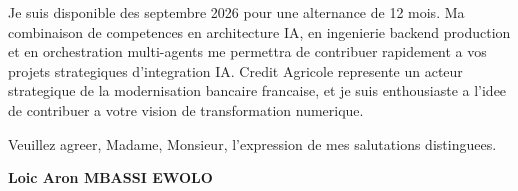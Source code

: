 \documentclass[a4paper,11pt]{article}
\begin{document}
Je suis disponible des septembre 2026 pour une alternance de 12 mois. Ma combinaison de competences en architecture IA, en ingenierie backend production et en orchestration multi-agents me permettra de contribuer rapidement a vos projets strategiques d'integration IA. Credit Agricole represente un acteur strategique de la modernisation bancaire francaise, et je suis enthousiaste a l'idee de contribuer a votre vision de transformation numerique.

\vspace{1.5em}
\noindent Veuillez agreer, Madame, Monsieur, l'expression de mes salutations distinguees.

\vspace{2em}
\noindent \textbf{Loic Aron MBASSI EWOLO}
\end{document}
